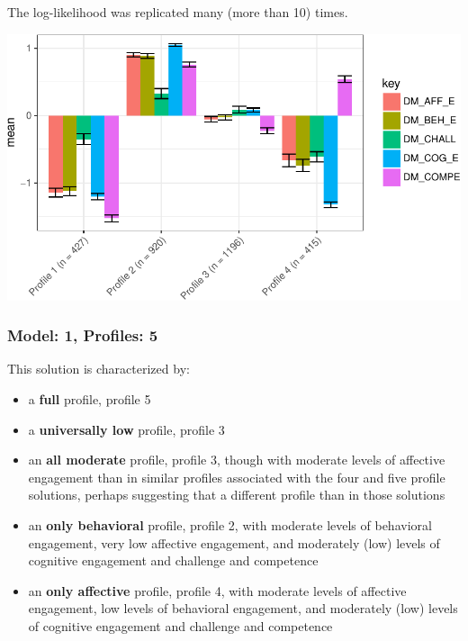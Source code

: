 \documentclass[]{msu-thesis}
\providecommand{\tightlist}{%
  \setlength{\itemsep}{0pt}\setlength{\parskip}{0pt}}
\theoremstyle{definition}
\theoremstyle{definition}
\theoremstyle{definition}
\theoremstyle{remark}
\begin{document}
The log-likelihood was replicated many (more than 10) times.

\begin{center}\includegraphics[width=0.8\linewidth]{rosenberg-dissertation_files/figure-latex/m1_4p-1} \end{center}

\subsubsection{Model: 1, Profiles: 5}\label{model-1-profiles-5}

This solution is characterized by:

\begin{itemize}
\tightlist
\item
  a \textbf{full} profile, profile 5
\item
  a \textbf{universally low} profile, profile 3
\item
  an \textbf{all moderate} profile, profile 3, though with moderate
  levels of affective engagement than in similar profiles associated
  with the four and five profile solutions, perhaps suggesting that a
  different profile than in those solutions
\item
  an \textbf{only behavioral} profile, profile 2, with moderate levels
  of behavioral engagement, very low affective engagement, and
  moderately (low) levels of cognitive engagement and challenge and
  competence
\item
  an \textbf{only affective} profile, profile 4, with moderate levels of
  affective engagement, low levels of behavioral engagement, and
  moderately (low) levels of cognitive engagement and challenge and
  competence
\end{itemize}
\end{document}
